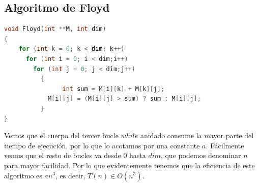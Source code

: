 \subsection{Algoritmo de Floyd}
\begin{lstlisting}[language=C]
void Floyd(int **M, int dim)
{
	for (int k = 0; k < dim; k++)
	  for (int i = 0; i < dim;i++)
	    for (int j = 0; j < dim;j++)
	      {
				int sum = M[i][k] + M[k][j];    	
		    M[i][j] = (M[i][j] > sum) ? sum : M[i][j];
	      }
}
\end{lstlisting}

Vemos que el cuerpo del tercer bucle $while$ anidado consume la mayor parte del tiempo de ejecución, por lo que lo acotamos por una constante $a$. Fácilmente vemos que el resto de bucles va desde 0 hasta $dim$, que podemos denominar $n$ para mayor facilidad. Por lo que evidentemente tenemos que la eficiencia de este algoritmo es $an^3$, es decir, $T(n)\in O(n^3)$.



